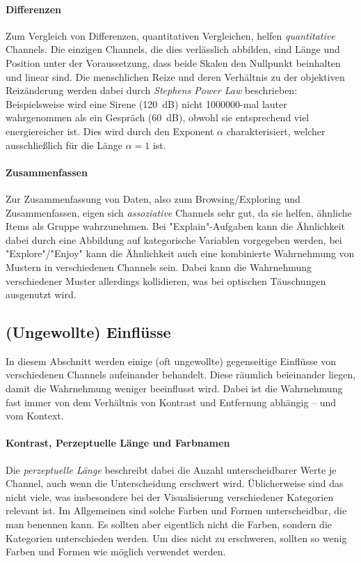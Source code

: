 			\paragraph{Differenzen}
				Zum Vergleich von Differenzen, \dh quantitativen Vergleichen, helfen \emph{quantitative} Channels. Die einzigen Channels, die dies verlässlich abbilden, sind Länge und Position unter der Voraussetzung, dass beide Skalen den Nullpunkt beinhalten und linear sind. Die menschlichen Reize und deren Verhältnis zu der objektiven Reizänderung werden dabei durch \emph{Stephens Power Law} beschrieben: Beispielsweise wird eine Sirene (\SI{120}{\deci\bel}) nicht \num{1000000}-mal lauter wahrgenommen als ein Gespräch (\SI{60}{\deci\bel}), obwohl sie entsprechend viel energiereicher ist. Dies wird durch den Exponent \(\alpha\) charakterisiert, welcher ausschließlich für die Länge \(\alpha = 1\) ist.

			\paragraph{Zusammenfassen}
				Zur Zusammenfassung von Daten, also zum Browsing/Exploring und Zusammenfassen, eigen sich \emph{assoziative} Channels sehr gut, da sie helfen, ähnliche Items als Gruppe wahrzunehmen. Bei "Explain"-Aufgaben kann die Ähnlichkeit dabei durch eine Abbildung auf kategorische Variablen vorgegeben werden, bei "Explore"/"Enjoy" kann die Ähnlichkeit auch eine kombinierte Wahrnehmung von Mustern in verschiedenen Channels sein. Dabei kann die Wahrnehmung verschiedener Muster allerdings kollidieren, was bei optischen Täuschungen ausgenutzt wird.

		\subsection{(Ungewollte) Einflüsse}
			In diesem Abschnitt werden einige (oft ungewollte) gegenseitige Einflüsse von verschiedenen Channels aufeinander behandelt. Diese räumlich beieinander liegen, damit die Wahrnehmung weniger beeinflusst wird. Dabei ist die Wahrnehmung fast immer von dem Verhältnis von Kontrast und Entfernung abhängig -- und vom Kontext.

			\paragraph{Kontrast, Perzeptuelle Länge und Farbnamen}
				Die \emph{perzeptuelle Länge} beschreibt dabei die Anzahl unterscheidbarer Werte je Channel, auch wenn die Unterscheidung erschwert wird. Üblicherweise sind das nicht viele, was insbesondere bei der Visualisierung verschiedener Kategorien relevant ist. Im Allgemeinen sind solche Farben und Formen unterscheidbar, die man benennen kann. Es sollten aber eigentlich nicht die Farben, sondern die Kategorien unterschieden werden. Um dies nicht zu erschweren, sollten so wenig Farben und Formen wie möglich verwendet werden.

